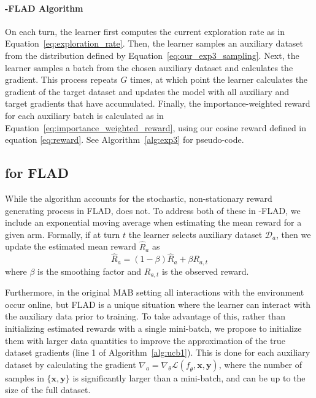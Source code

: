 \paragraph{\ex{}-FLAD Algorithm}
On each turn, the learner first computes the current exploration rate as in Equation~\ref{eq:exploration_rate}. Then, the learner samples an auxiliary dataset from the distribution defined by Equation~\ref{eq:our_exp3_sampling}. Next, the learner samples a batch from the chosen auxiliary dataset and calculates the gradient. This process repeats $G$ times, at which point the learner calculates the gradient of the target dataset and updates the model with all auxiliary and target gradients that have accumulated. Finally, the importance-weighted reward for each auxiliary batch is calculated as in Equation~\ref{eq:importance_weighted_reward}, using our cosine reward defined in equation \ref{eq:reward}. See Algorithm~\ref{alg:exp3} for pseudo-code.

\subsection{\ucb{} for FLAD}
While the \ex{} algorithm accounts for the stochastic, non-stationary reward generating process in FLAD, \ucb{} does not. To address both of these in \ucb{}-FLAD, we include an exponential moving average when estimating the mean reward for a given arm.
Formally, if at turn $t$ the learner selects auxiliary dataset $\mathcal{D}_a$, then we update the estimated mean reward $\hat{R}_{a}$ as 
\begin{equation}
\label{eq:ema_smoothing}
    \hat{R}_{a} = (1-\beta)\hat{R}_{a} + \beta R_{a,t}
\end{equation}
where $\beta$ is the smoothing factor and $R_{a,t}$ is the observed reward.

Furthermore, in the original MAB setting all interactions with the environment occur online, but FLAD is a unique situation where the learner can interact with the auxiliary data prior to training.
To take advantage of this, rather than initializing estimated rewards with a single mini-batch, we propose to initialize them with larger data quantities to improve the approximation of the true dataset gradients (line 1 of Algorithm~\ref{alg:ucb1}).
This is done for each auxiliary dataset by calculating the gradient $\nabla_{a}=\nabla_{\theta}\mathcal{L}(\mathit{f}_{\theta},\mathbf{x},\mathbf{y})$, where the number of samples in $\{\mathbf{x},\mathbf{y}\}$ is significantly larger than a mini-batch, and can be up to the size of the full dataset.

